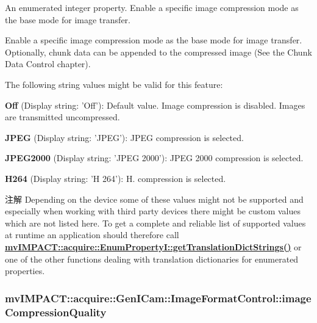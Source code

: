 An enumerated integer property. Enable a specific image compression mode as the base mode for image transfer. 

Enable a specific image compression mode as the base mode for image transfer. Optionally, chunk data can be appended to the compressed image (See the Chunk Data Control chapter).

The following string values might be valid for this feature\+:
\begin{DoxyItemize}
\item {\bfseries Off} (Display string\+: 'Off')\+: Default value. Image compression is disabled. Images are transmitted uncompressed.
\item {\bfseries J\+P\+E\+G} (Display string\+: 'J\+P\+E\+G')\+: J\+P\+E\+G compression is selected.
\item {\bfseries J\+P\+E\+G2000} (Display string\+: 'J\+P\+E\+G 2000')\+: J\+P\+E\+G 2000 compression is selected.
\item {\bfseries H264} (Display string\+: 'H 264')\+: H. compression is selected.
\end{DoxyItemize}

\begin{DoxyNote}{注解}
Depending on the device some of these values might not be supported and especially when working with third party devices there might be custom values which are not listed here. To get a complete and reliable list of supported values at runtime an application should therefore call {\bfseries \hyperlink{classmv_i_m_p_a_c_t_1_1acquire_1_1_enum_property_i_a0ba6ccbf5ee69784d5d0b537924d26b6}{mv\+I\+M\+P\+A\+C\+T\+::acquire\+::\+Enum\+Property\+I\+::get\+Translation\+Dict\+Strings()}} or one of the other functions dealing with translation dictionaries for enumerated properties. 
\end{DoxyNote}
\hypertarget{classmv_i_m_p_a_c_t_1_1acquire_1_1_gen_i_cam_1_1_image_format_control_adb54973b40c5ad21e4ed201712de6e52}{
\subsubsection[{image\+Compression\+Quality}]{ mv\+I\+M\+P\+A\+C\+T\+::acquire\+::\+Gen\+I\+Cam\+::\+Image\+Format\+Control\+::image\+Compression\+Quality}}\label{classmv_i_m_p_a_c_t_1_1acquire_1_1_gen_i_cam_1_1_image_format_control_adb54973b40c5ad21e4ed201712de6e52}


